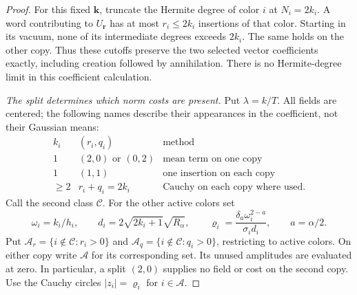\documentclass[12pt]{article}
\numberwithin{equation}{section}
\theoremstyle{definition}
\begin{document}
\begin{proof}
  For this fixed $\boldsymbol k$, truncate the Hermite degree of color $i$
  at $N_i=2k_i$. A word contributing to $U_{\boldsymbol r}$ has at most
  $r_i\le2k_i$ insertions of that color. Starting in its vacuum, none of
  its intermediate degrees exceeds $2k_i$. The same holds on the other
  copy. Thus these cutoffs preserve the two selected vector coefficients
  exactly, including creation followed by annihilation. There is no
  Hermite-degree limit in this coefficient calculation.

  \emph{The split determines which norm costs are present.}
  Put $\lambda=k/T$. All fields are centered; the following names describe
  their appearances in the coefficient, not their Gaussian means:
  \[
    \begin{array}{c|c|c}
      k_i & (r_i,q_i)&\text{method}\\ \hline
      1 &(2,0)\text{ or }(0,2)&\text{mean term on one copy}\\
      1 &(1,1)&\text{one insertion on each copy}\\
      \ge2 &r_i+q_i=2k_i&\text{Cauchy on each copy where used}.
    \end{array}
  \]
  Call the second class $\mathcal C$. For the other active colors set
  \[
    \omega_i=k_i/h_i,\qquad
    d_i=2\sqrt{2k_i+1}\sqrt{R_\alpha},\qquad
    \varrho_i=\frac{\delta_a\omega_i^{2-a}}{\sigma_i d_i},
    \qquad a=\alpha/2.
  \]
  Put $\mathcal A_r=\{i\notin\mathcal C:r_i>0\}$ and
  $\mathcal A_q=\{i\notin\mathcal C:q_i>0\}$, restricting to active colors.
  On either copy write $\mathcal A$ for its corresponding set.
  Its unused amplitudes are evaluated at zero.
  In particular, a split $(2,0)$ supplies no field or cost on the second
  copy. Use the Cauchy circles $|z_i|=\varrho_i$ for $i\in\mathcal A$.


\end{proof}
\end{document}
